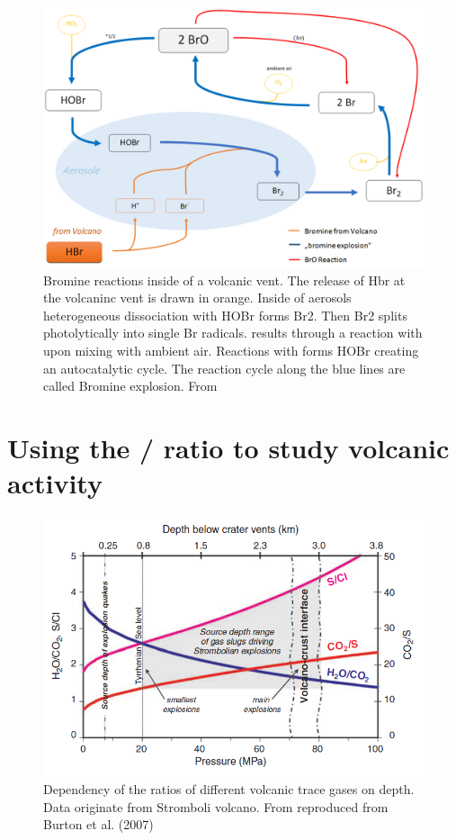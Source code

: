 \documentclass  [
  paper    = a4,
  BCOR     = 10mm,
  twoside,
  fontsize = 12pt,
  fleqn,
  toc      = bibnumbered,
  toc      = listofnumbered,
  numbers  = noendperiod,
  headings = normal,
  listof   = leveldown,
  version  = 3.03
]                                       {scrreprt}
\begin{document}
\begin{figure}
	\centering
	\includegraphics[width=0.9\linewidth]{Bilder/Simon/Bilder_Tung/BrO_Explosion}
	\caption{Bromine reactions inside of a volcanic vent. The release of Hbr at the volcaninc vent is drawn  in orange. Inside of aerosols heterogeneous dissociation with HOBr forms Br2. Then Br2 splits photolytically into single Br radicals.   results through a reaction with  upon mixing with ambient air. Reactions with    forms HOBr creating an autocatalytic cycle. The reaction cycle along the blue lines are called Bromine explosion. From \cite{WarnachSimon}}
	\label{fig:broexplosion}
\end{figure}








\section{Using the /  ratio to study volcanic activity}
\begin{figure}
	\centering
	\includegraphics[width=0.9\linewidth]{Zwischenbericht2018/Bilder/so2_bro}
	\caption{Dependency of the ratios of different volcanic trace gases on depth. Data originate from Stromboli volcano. From \cite{lubcke2014optical} reproduced from Burton et al. (2007)}
	\label{fig:so2bro}
\end{figure}    
	
\end{document}
